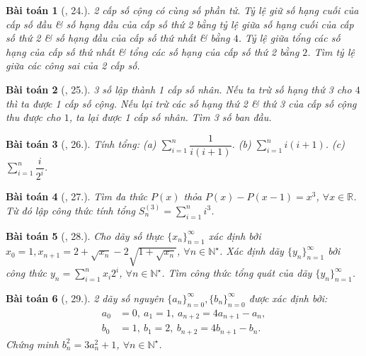 \documentclass{article}
\newtheorem{baitoan}{Bài toán}
\begin{document}
\begin{baitoan}[\cite{TLCT_dai_so_giai_tich_11}, 24.]
	2 cấp số cộng có cùng số phần tử. Tỷ lệ giữ số hạng cuối của cấp số đầu \& số hạng đầu của cấp số thứ 2 bằng tỷ lệ giữa số hạng cuối của cấp số thứ 2 \& số hạng đầu của cấp số thứ nhất \& bằng $4$. Tỷ lệ giữa tổng các số hạng của cấp số thứ nhất \& tổng các số hạng của cấp số thứ 2 bằng $2$. Tìm tỷ lệ giữa các công sai của 2 cấp số.
\end{baitoan}

\begin{baitoan}[\cite{TLCT_dai_so_giai_tich_11}, 25.]
	3 số lập thành 1 cấp số nhân. Nếu ta trừ số hạng thứ 3 cho $4$  thì ta được 1 cấp số cộng. Nếu lại trừ các số hạng thứ 2 \& thứ 3 của cấp số cộng thu được cho $1$, ta lại được 1 cấp số nhân. Tìm 3 số ban đầu.
\end{baitoan}

\begin{baitoan}[\cite{TLCT_dai_so_giai_tich_11}, 26.]
	Tính tổng: (a) $\sum_{i=1}^n \dfrac{1}{i(i + 1)}$. (b) $\sum_{i=1}^n i(i + 1)$. (c) $\sum_{i=1}^n \dfrac{i}{2^i}$.
\end{baitoan}

\begin{baitoan}[\cite{TLCT_dai_so_giai_tich_11}, 27.]
	Tìm đa thức $P(x)$ thỏa $P(x) - P(x - 1) = x^3$, $\forall x\in\mathbb{R}$. Từ đó lập công thức tính tổng $S_n^{(3)} = \sum_{i=1}^n i^3$.
\end{baitoan}

\begin{baitoan}[\cite{TLCT_dai_so_giai_tich_11}, 28.]
	Cho dãy số thực $\{x_n\}_{n=1}^\infty$ xác định bởi $x_0 = 1,x_{n+1} = 2 + \sqrt{x_n} - 2\sqrt{1 + \sqrt{x_n}}$, $\forall n\in\mathbb{N}^\star$. Xác định dãy $\{y_n\}_{n=1}^\infty$ bởi công thức $y_n = \sum_{i=1}^n x_i2^i$, $\forall n\in\mathbb{N}^\star$. Tìm công thức tổng quát của dãy $\{y_n\}_{n=1}^\infty$.
\end{baitoan}

\begin{baitoan}[\cite{TLCT_dai_so_giai_tich_11}, 29.]
	2 dãy số nguyên $\{a_n\}_{n=0}^\infty,\{b_n\}_{n=0}^\infty$ được xác định bởi:
	\begin{align*}
		a_0 &= 0,\ a_1 = 1,\ a_{n+2} = 4a_{n+1} - a_n,\\
		b_0 &= 1,\ b_1 = 2,\ b_{n+2} = 4b_{n+1} - b_n.
	\end{align*}
	Chứng minh $b_n^2 = 3a_n^2 + 1$, $\forall n\in\mathbb{N}^\star$.
\end{baitoan}
\end{document}
